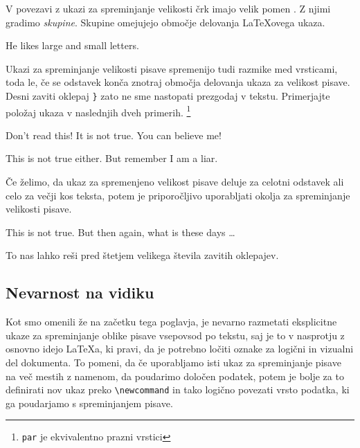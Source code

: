 V povezavi z ukazi za spreminjanje velikosti črk imajo velik pomen
. Z njimi gradimo \emph{skupine}.  Skupine
omejujejo območje delovanja \LaTeX{}ovega ukaza.

\begin{example}
He likes {\LARGE large and 
{\small small} letters}. 
\end{example}
 
Ukazi za spreminjanje velikosti pisave spremenijo tudi razmike med vrsticami,
toda le, če se odstavek konča znotraj območja delovanja ukaza za velikost pisave. 
Desni zaviti oklepaj \verb|}| zato ne sme nastopati prezgodaj v tekstu. Primerjajte položaj ukaza
 v naslednjih dveh primerih. \footnote{\texttt{\bs{}par}
je ekvivalentno prazni vrstici}


\begin{example}
{\Large Don't read this! It is not
true. You can believe me!\par}
\end{example}

\begin{example}
{\Large This is not true either.
But remember I am a liar.}\par
\end{example}

Če želimo, da ukaz za spremenjeno velikost pisave deluje za celotni odstavek 
ali celo za večji kos teksta, potem je priporočljivo uporabljati okolja 
za spreminjanje velikosti pisave.
\begin{example}
\begin{Large} 
This is not true.
But then again, what is these
days \ldots
\end{Large}
\end{example}
\noindent To nas lahko reši pred štetjem velikega števila zavitih oklepajev.


\subsection{Nevarnost na vidiku}

Kot smo omenili že na začetku tega poglavja, je nevarno 
razmetati eksplicitne ukaze za spreminjanje oblike pisave vsepovsod po tekstu,
saj je to v nasprotju z osnovno idejo \LaTeX{}a, ki pravi, da je potrebno ločiti oznake za logični in vizualni 
del dokumenta. To pomeni, da če uporabljamo isti ukaz za spreminjanje pisave na več mestih z namenom, 
da poudarimo določen podatek, potem je bolje za to definirati nov ukaz preko
\verb|\newcommand| in tako logično povezati vrsto podatka, ki ga poudarjamo 
s spreminjanjem pisave.

